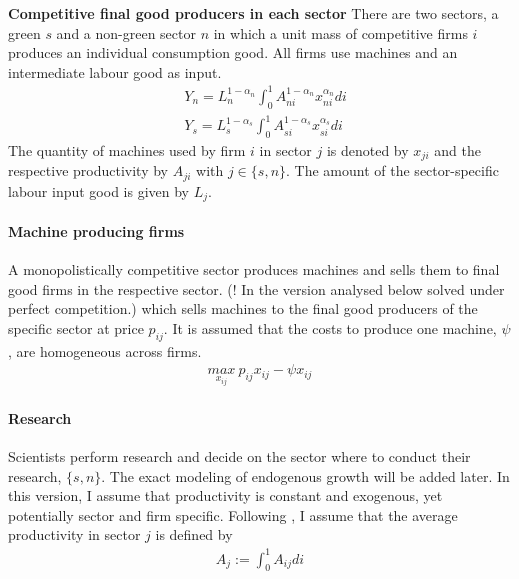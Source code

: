 \noindent\textbf{Competitive final good producers in each sector}
There are two sectors, a green $s$ and a non-green sector $n$ in which a unit mass of competitive firms $i$ produces an individual consumption good. All firms use machines and an intermediate labour good as input. 
\begin{align*}
&Y_n= L_n^{1-\alpha_n}\int_{0}^{1}A_{ni}^{1-\alpha_n}x_{ni}^{\alpha_n} di\\
&Y_s= L_s^{1-\alpha_s}\int_{0}^{1}A_{si}^{1-\alpha_s}x_{si}^{\alpha_s} di
\end{align*}
The quantity of machines used by firm $i$ in sector $j$ is denoted by $x_{ji}$ and the respective productivity by $A_{ji}$ with $j\in\{s,n\}$. The amount of the sector-specific labour input good is given by $L_j$.


\paragraph{Machine producing firms}

A monopolistically competitive sector produces machines and sells them to final good firms in the respective sector. (! In the version analysed below solved under perfect competition.) which sells machines to the final good producers of the specific sector at price $p_{ij}$. It is assumed that the costs to produce one machine, $\psi$, are homogeneous across firms.
\begin{align*}
\underset{x_{ij}}{max}\  p_{ij}x_{ij}-\psi x_{ij}
\end{align*}

\paragraph{Research}
Scientists perform research and decide on the sector where to conduct their research, $\{s,n\}$. The exact modeling of endogenous growth will be added later. In this version, I assume that productivity is constant and exogenous, yet potentially sector and firm specific. 
Following \cite{Acemoglu2012TheChange}, I assume that the average productivity in sector $j$ is defined by
\begin{align*}
	A_j:=\int_{0}^{1}A_{ij}di
\end{align*}

